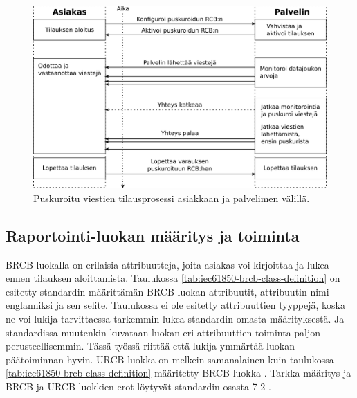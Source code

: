 \begin{figure}
	\includegraphics[width=1\textwidth]{pictures/iec61850-brcb-communication.png}
	\caption{Puskuroitu viestien tilausprosessi asiakkaan ja palvelimen välillä.}
	\label{fig:iec61850-brcb-communication}
\end{figure}


\subsection{Raportointi-luokan määritys ja toiminta}
BRCB-luokalla on erilaisia attribuutteja, joita asiakas voi kirjoittaa ja lukea ennen tilauksen aloittamista. Taulukossa \ref{tab:iec61850-brcb-class-definition} on esitetty standardin määrittämän BRCB-luokan attribuutit, attribuutin nimi englanniksi ja sen selite. Taulukossa ei ole esitetty attribuuttien tyyppejä, koska ne voi lukija tarvittaessa tarkemmin lukea standardin omasta määrityksestä. Ja standardissa muutenkin kuvataan luokan eri attribuuttien toiminta paljon perusteellisemmin. Tässä työssä riittää että lukija ymmärtää luokan päätoiminnan hyvin. URCB-luokka on melkein samanalainen kuin taulukossa \ref{tab:iec61850-brcb-class-definition} määritetty BRCB-luokka \cite[s.~94--103]{IEC61850-7-2}. Tarkka määritys ja BRCB ja URCB luokkien erot löytyvät standardin osasta 7-2 \cite[s.~93--118]{IEC61850-7-2}.

